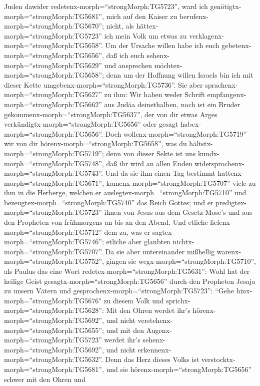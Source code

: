 Juden dawider redetenx-morph=``strongMorph:TG5723'', ward ich
genötigtx-morph=``strongMorph:TG5681'', mich auf den Kaiser zu
berufenx-morph=``strongMorph:TG5670''; nicht, als
hättex-morph=``strongMorph:TG5723'' ich mein Volk um etwas zu
verklagenx-morph=``strongMorph:TG5658''.  Um der Ursache
willen habe ich euch gebetenx-morph=``strongMorph:TG5656'', daß ich euch
sehenx-morph=``strongMorph:TG5629'' und ansprechen
möchtex-morph=``strongMorph:TG5658''; denn um der Hoffnung willen
Israels bin ich mit dieser Kette umgebenx-morph=``strongMorph:TG5736''.
 Sie aber sprachenx-morph=``strongMorph:TG5627'' zu ihm:
Wir haben weder Schrift empfangenx-morph=``strongMorph:TG5662'' aus
Judäa deinethalben, noch ist ein Bruder
gekommenx-morph=``strongMorph:TG5637'', der von dir etwas Arges
verkündigtx-morph=``strongMorph:TG5656'' oder gesagt
habex-morph=``strongMorph:TG5656''.  Doch
wollenx-morph=``strongMorph:TG5719'' wir von dir
hörenx-morph=``strongMorph:TG5658'', was du
hältstx-morph=``strongMorph:TG5719''; denn von dieser Sekte ist uns
kundx-morph=``strongMorph:TG5748'', daß ihr wird an allen Enden
widersprochenx-morph=``strongMorph:TG5743''.  Und da sie
ihm einen Tag bestimmt hattenx-morph=``strongMorph:TG5671'',
kamenx-morph=``strongMorph:TG5707'' viele zu ihm in die Herberge,
welchen er auslegtex-morph=``strongMorph:TG5710'' und
bezeugtex-morph=``strongMorph:TG5740'' das Reich Gottes; und er
predigtex-morph=``strongMorph:TG5723'' ihnen von Jesus aus dem Gesetz
Mose's und aus den Propheten von frühmorgens an bis an den Abend.
 Und etliche fielenx-morph=``strongMorph:TG5712'' dem zu,
was er sagtex-morph=``strongMorph:TG5746''; etliche aber glaubten
nichtx-morph=``strongMorph:TG5707''.  Da sie aber
untereinander mißhellig warenx-morph=``strongMorph:TG5752'', gingen sie
wegx-morph=``strongMorph:TG5710'', als Paulus das eine Wort
redetex-morph=``strongMorph:TG5631'': Wohl hat der heilige Geist
gesagtx-morph=``strongMorph:TG5656'' durch den Propheten Jesaja zu
unsern Vätern  und
gesprochenx-morph=``strongMorph:TG5723'': ``Gehe
hinx-morph=''strongMorph:TG5676" zu diesem Volk und
sprichx-morph=``strongMorph:TG5628'': Mit den Ohren werdet ihr's
hörenx-morph=``strongMorph:TG5692'', und nicht
verstehenx-morph=``strongMorph:TG5655''; und mit den
Augenx-morph=``strongMorph:TG5723'' werdet ihr's
sehenx-morph=``strongMorph:TG5692'', und nicht
erkennenx-morph=``strongMorph:TG5632''.  Denn das Herz
dieses Volks ist verstocktx-morph=``strongMorph:TG5681'', und sie
hörenx-morph=``strongMorph:TG5656'' schwer mit den Ohren und
